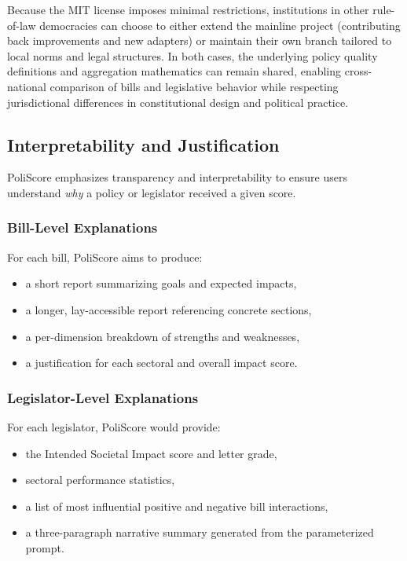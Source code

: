 \documentclass[12pt]{article}
\begin{document}
Because the MIT license imposes minimal restrictions, institutions in other rule-of-law democracies can choose to either
extend the mainline project (contributing back improvements and new adapters) or maintain their own branch tailored to
local norms and legal structures. In both cases, the underlying policy quality definitions and aggregation mathematics
can remain shared, enabling cross-national comparison of bills and legislative behavior while respecting jurisdictional
differences in constitutional design and political practice.

\subsection{Interpretability and Justification}

PoliScore emphasizes transparency and interpretability to ensure users understand \emph{why} a policy or legislator
received a given score.

\subsubsection{Bill-Level Explanations}

For each bill, PoliScore aims to produce:

\begin{itemize}
    \item a short report summarizing goals and expected impacts,
    \item a longer, lay-accessible report referencing concrete sections,
    \item a per-dimension breakdown of strengths and weaknesses,
    \item a justification for each sectoral and overall impact score.
\end{itemize}

\subsubsection{Legislator-Level Explanations}

For each legislator, PoliScore would provide:

\begin{itemize}
    \item the Intended Societal Impact score and letter grade,
    \item sectoral performance statistics,
    \item a list of most influential positive and negative bill interactions,
    \item a three-paragraph narrative summary generated from the parameterized prompt.
\end{itemize}
\end{document}
